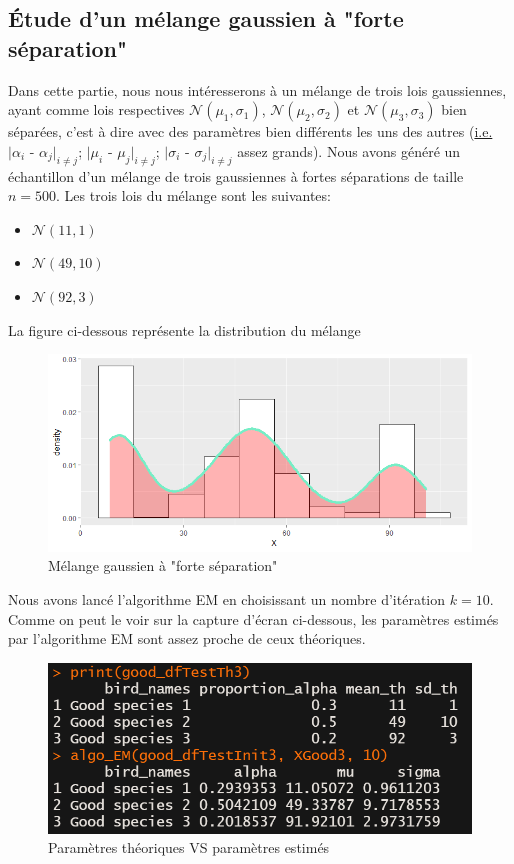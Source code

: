 \documentclass[frenchb]{report}
\newcommand{\1}{\mathbbm{1}}
\theoremstyle{definition}\newtheorem{defn}{Définition}
\theoremstyle{definition}\newtheorem{exm}{Exemple}
\theoremstyle{definition}\newtheorem{nota}{Notation}
\theoremstyle{definition}\newtheorem{rem}{Remarque}
\begin{document}
\subsection{Étude d'un mélange gaussien à "forte séparation"}
Dans cette partie, nous nous intéresserons à un mélange de trois lois gaussiennes, ayant comme lois respectives $\mathcal{N}(\mu_1, \sigma_1)$, $\mathcal{N}(\mu_2, \sigma_2)$ et $\mathcal{N}(\mu_3, \sigma_3)$ bien séparées, c'est à dire avec des paramètres bien différents les uns des autres (\underline{i.e. }$|\alpha_i$ - $\alpha_j|_{i \neq j}$; $|\mu_i$ - $\mu_j|_{i \neq j}$; $|\sigma_i$ - $\sigma_j|_{i \neq j}$ assez grands). Nous avons généré un échantillon d'un mélange de trois gaussiennes à fortes séparations de taille $n = 500$. Les trois lois du mélange sont les suivantes:
\begin{itemize}
	\item $\mathcal{N}(11, 1)$
	\item $\mathcal{N}(49, 10)$
	\item $\mathcal{N}(92, 3)$
\end{itemize}
La figure ci-dessous représente la distribution du mélange
\begin{figure}[H]
	\centering
	\includegraphics[scale=0.7]{images/good_distrib.png}
	\caption{Mélange gaussien à "forte séparation"}
\end{figure}
\newpage
Nous avons lancé l'algorithme EM en choisissant un nombre d'itération $k = 10$. Comme on peut le voir sur la capture d'écran ci-dessous, les paramètres estimés par l'algorithme EM sont assez proche de ceux théoriques.
\begin{figure}[H]
	\centering
	\includegraphics[scale=0.7]{images/EM_good.png}
	\caption{Paramètres théoriques VS paramètres estimés}
\end{figure}
\end{document}
